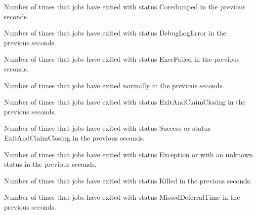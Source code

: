 \begin{description}
\item[\AdAttr{RecentJobsCoredumped}:] Number of times that jobs have exited with status Coredumped
  in the previous  seconds.

\item[\AdAttr{RecentJobsDebugLogError}:] Number of times that jobs have exited with status DebugLogError
  in the previous  seconds.

\item[\AdAttr{RecentJobsExecFailed}:] Number of times that jobs have exited with status ExecFailed
  in the previous  seconds.

\item[\AdAttr{RecentJobsExited}:] Number of times that jobs have exited normally
  in the previous  seconds.

\item[\AdAttr{RecentJobsExitedAndClaimClosing}:] Number of times that jobs have exited with status ExitAndClaimClosing
  in the previous  seconds.

\item[\AdAttr{RecentJobsExitedNormally}:] Number of times that jobs have exited with status Success or status ExitAndClaimClosing
  in the previous  seconds.

\item[\AdAttr{RecentJobsExitException}:] Number of times that jobs have exited with status Exception or with an unknown status
  in the previous  seconds.

\item[\AdAttr{RecentJobsKilled}:] Number of times that jobs have exited with status Killed
  in the previous  seconds.

\item[\AdAttr{RecentJobsMissedDeferralTime}:] Number of times that jobs have exited with status MissedDeferralTime
  in the previous  seconds.


\end{description}
